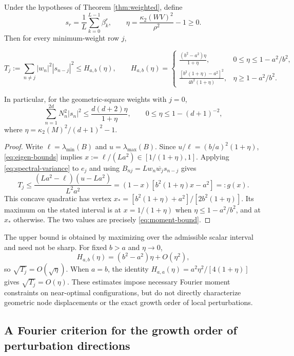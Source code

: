 \documentclass[10pt,twoside,final]{siamart1116}
\numberwithin{equation}{section}
\numberwithin{theorem}{section}
\newcommand{\cond}{\kappa_2}
\begin{document}
\begin{proposition}
\label{prop:near}
Under the hypotheses of Theorem \ref{thm:weighted}, define
\[
s_r=\frac1L\sum_{k=0}^{L-1}\beta_k^r,\qquad
\eta=\frac{\cond(WV)^2}{\rho^2}-1\ge0.
\]
Then for every minimum-weight row $j$,

\begin{equation}\label{eq:moment-bound}
T_j:=\sum_{n\ne j}|w_n|^2|s_{n-j}|^2\le H_{a,b}(\eta),\qquad
H_{a,b}(\eta)=\begin{cases}
\displaystyle\frac{(b^2-a^2)\eta}{1+\eta},&0\le\eta\le1-a^2/b^2,\\[6pt]
\displaystyle\frac{[b^2(1+\eta)-a^2]^2}{4b^2(1+\eta)},&\eta\ge1-a^2/b^2.
\end{cases}
\end{equation}

In particular, for the geometric-square weights with $j=0$,
\begin{equation}\label{eq:triangle-moment}
\sum_{n=1}^{2d}N_n^2|s_n|^2
\le\frac{d(d+2)\eta}{1+\eta},\qquad 0\le\eta\le1-(d+1)^{-2},
\end{equation}
where $\eta=\cond(M)^2/(d+1)^2-1$.
\end{proposition}
\begin{proof}
Write $\ell=\lambda_{\min}(B)$ and $u=\lambda_{\max}(B)$. Since
$u/\ell=(b/a)^2(1+\eta)$, \eqref{eq:eigen-bounds} implies
$x:=\ell/(La^2)\in[1/(1+\eta),1]$. Applying \eqref{eq:spectral-variance}
to $e_j$ and using $B_{nj}=Lw_n\overline{w_j}s_{n-j}$ gives
\[
T_j\le\frac{(La^2-\ell)(u-La^2)}{L^2a^2}
=(1-x)[b^2(1+\eta)x-a^2]=:g(x).
\]
This concave quadratic has vertex
$x_*=[b^2(1+\eta)+a^2]/[2b^2(1+\eta)]$. Its maximum on the stated interval
is at $x=1/(1+\eta)$ when $\eta\le1-a^2/b^2$, and at $x_*$ otherwise.
The two values are precisely \eqref{eq:moment-bound}.
\end{proof}

The upper bound is obtained by maximizing over the admissible scalar interval
and need not be sharp. For fixed $b>a$ and $\eta\to0$,
\[
H_{a,b}(\eta)=(b^2-a^2)\eta+O(\eta^2),
\]
so $\sqrt{T_j}=O(\sqrt{\eta})$. When $a=b$, the identity
$H_{a,a}(\eta)=a^2\eta^2/[4(1+\eta)]$ gives $\sqrt{T_j}=O(\eta)$.
These estimates impose necessary Fourier moment constraints on near-optimal
configurations, but do not directly characterize geometric node displacements
or the exact growth order of local perturbations.

\subsection{A Fourier criterion for the growth order of perturbation directions}
\end{document}
